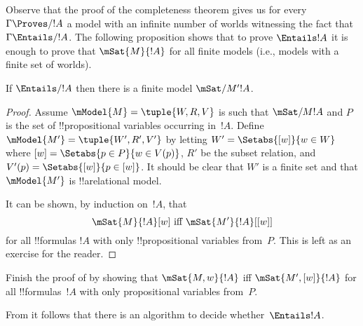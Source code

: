 \documentclass[../../../include/open-logic-section]{subfiles}
\begin{document}
Observe that the proof of the completeness theorem gives us for every
$\Gamma \Proves/ !A$ a model with an infinite number of worlds
witnessing the fact that $\Gamma \Entails/ !A$. The following
proposition shows that to prove $\Entails !A$ it is enough to prove
that $\mSat{M}{!A}$ for all finite models (i.e., models with a finite
set of worlds).

\begin{thm}
  If $\Entails/ !A$ then there is a finite model $\mSat/{M'}{!A}$.
\end{thm}

\begin{proof}
  Assume $\mModel{M}=\tuple{W, R, V}$ is such that $\mSat/{M}{!A}$ and $P$ 
  is the set of !!{propositional variable}s occurring in~$!A$. Define
  $\mModel{M'}=\tuple{W', R', V'}$ by letting $W' = \Setabs{[w]}{w \in W}$ 
  where $[w] = \Setabs{p \in P}{w \in V(p)}$, $R'$ be the subset relation, 
  and $V'(p)=\Setabs{[w]}{p \in [w]}$. It should be clear that $W'$ is a 
  finite set and that $\mModel{M'}$ is !!a{relational model}.

  It can be shown, by induction on~$!A$, that 
  \[
    \mSat{M}{!A}[w] \text{ iff } \mSat{M'}{!A}[{[w]}]
  \]
  for all !!{formula}s $!A$ with only !!{propositional variable}s
  from~$P$. This is left as an exercise for the reader.
\end{proof}

\begin{prob}
Finish the proof of  by showing
that $\mSat{M,w}{!A}$ iff $\mSat{M',[w]}{!A}$ for all !!{formula}s~$!A$
with only propositional variables from~$P$. 
\end{prob}

From  it follows that there is an algorithm to
decide whether~$\Entails !A$.
\end{document}

